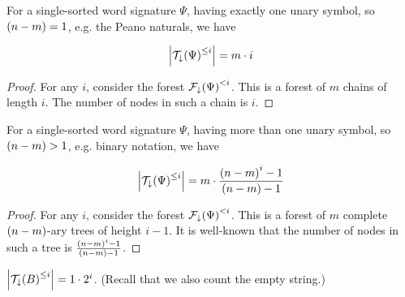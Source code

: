 \begin{theorem} For a single-sorted word signature $\Psi$, having exactly one
unary symbol, so $\p{n-m}=1$, e.g. the Peano naturals, we have

$$\card{\mathcal{T}_\downarrow\p{\Psi}^{\leq i}} = m \cdot i$$

\end{theorem}

\begin{proof} For any $i$, consider the forest
$\mathcal{F}_\downarrow\p{\Psi}^{< i}$. This is a forest of $m$ chains of
length $i$. The number of nodes in such a chain is $i$.  \end{proof}

\begin{theorem} For a single-sorted word signature $\Psi$, having more than one
unary symbol, so $\p{n-m}>1$, e.g. binary notation, we have

$$\card{\mathcal{T}_\downarrow\p{\Psi}^{\leq i}} = m \cdot
\frac{\p{n-m}^i-1}{\p{n - m} - 1}$$

\end{theorem}

\begin{proof} For any $i$, consider the forest
$\mathcal{F}_\downarrow\p{\Psi}^{< i}$. This is a forest of $m$ complete
$\p{n-m}$-ary trees of height $i-1$. It is well-known that the number of nodes
in such a tree is $\frac{\p{n-m}^i-1}{\p{n - m} - 1}$\cite{cormen-et-al-2009}.
\end{proof}

\begin{example} $\card{\mathcal{T}_\downarrow\p{B}^{\leq i}} = 1 \cdot 2^i$.
(Recall that we also count the empty string.) \end{example}






